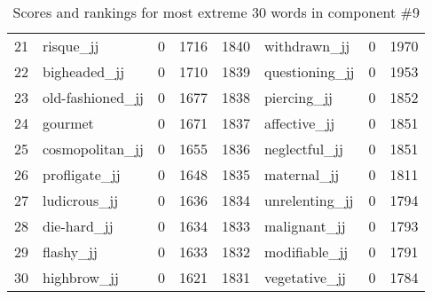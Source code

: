 \begin{table}[tbp]
\begin{tabular}{| rlr@{.}l | rlr@{.}l |}
    21 & risque\_jj & 0 & 1716    &    1840 & withdrawn\_jj & 0 & 1970 \\
    22 & bigheaded\_jj & 0 & 1710    &    1839 & questioning\_jj & 0 & 1953 \\
    23 & old-fashioned\_jj & 0 & 1677    &    1838 & piercing\_jj & 0 & 1852 \\
    24 & gourmet & 0 & 1671    &    1837 & affective\_jj & 0 & 1851 \\
    25 & cosmopolitan\_jj & 0 & 1655    &    1836 & neglectful\_jj & 0 & 1851 \\
    26 & profligate\_jj & 0 & 1648    &    1835 & maternal\_jj & 0 & 1811 \\
    27 & ludicrous\_jj & 0 & 1636    &    1834 & unrelenting\_jj & 0 & 1794 \\
    28 & die-hard\_jj & 0 & 1634    &    1833 & malignant\_jj & 0 & 1793 \\
    29 & flashy\_jj & 0 & 1633    &    1832 & modifiable\_jj & 0 & 1791 \\
    30 & highbrow\_jj & 0 & 1621    &    1831 & vegetative\_jj & 0 & 1784 \\
    \hline
    \end{tabular}
    \caption{Scores and rankings for most extreme 30 words in component \#9} 
\end{table}
\clearpage
